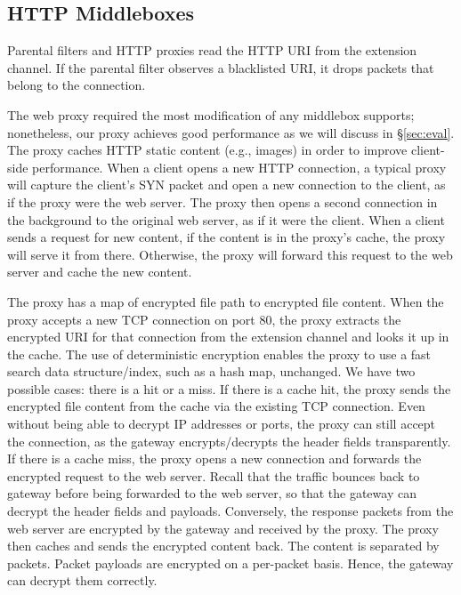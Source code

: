 \subsection{HTTP Middleboxes}
Parental filters and HTTP proxies read the HTTP URI from the extension channel. 
If the parental filter observes a blacklisted URI, it drops packets that belong to the connection.

The web proxy required the most modification of any middlebox \sys supports; nonetheless, our proxy achieves good performance as we will discuss in \S\ref{sec:eval}.
The proxy caches HTTP static content (e.g., images) in order to improve client-side performance. 
When a client opens a new HTTP connection, a typical proxy will capture the client's SYN packet and open a new connection to the client, as if the proxy were the web server. The proxy then opens a second connection in the background to the original web server, as if it were the client. 
When a client sends a request for new content, if the content is in the proxy's cache, the proxy will serve it from there. Otherwise, the proxy will forward this request to the web server and cache the new content. 

The proxy has a map of encrypted file path to encrypted file content. When the proxy accepts a new TCP connection on port 80, the proxy extracts the encrypted URI for that connection from the extension channel and looks it up in the cache. The use of deterministic encryption enables the proxy to use a fast search data structure/index, such as a hash map, unchanged. We have two possible cases: there is a hit or a miss. If there is a cache hit, the proxy sends the encrypted file content from the cache via the existing TCP connection. Even without being able to decrypt IP addresses or ports, the proxy can still accept the connection, as the gateway encrypts/decrypts the header fields transparently.
If there is a cache miss, the proxy opens a new connection and forwards the encrypted request to the web server. Recall that the traffic bounces back to gateway before being forwarded to the web server, so that the gateway can decrypt the header fields and payloads. Conversely, the response packets from the web server are encrypted by the gateway and received by the proxy. The proxy then caches and sends the encrypted content back. The content is separated by packets. Packet payloads are encrypted on a per-packet basis. Hence, the gateway can decrypt them correctly.

